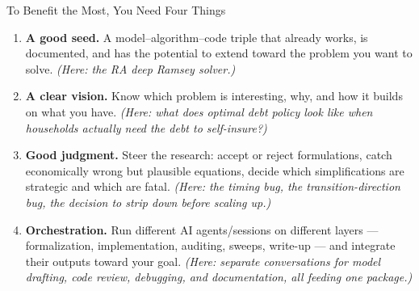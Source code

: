 \documentclass[10pt,aspectratio=169]{beamer}
\begin{document}
\begin{frame}{To Benefit the Most, You Need Four Things}
\begin{enumerate}
    \item \textbf{A good seed.} A model--algorithm--code triple that already works, is documented,
          and has the potential to extend toward the problem you want to solve.
          \emph{(Here: the RA deep Ramsey solver.)}
    \medskip
    \item \textbf{A clear vision.} Know which problem is interesting, why, and how it builds on
          what you have. \emph{(Here: what does optimal debt policy look like when households
          actually need the debt to self-insure?)}
    \medskip
    \item \textbf{Good judgment.} Steer the research: accept or reject formulations, catch
          economically wrong but plausible equations, decide which simplifications are strategic
          and which are fatal. \emph{(Here: the timing bug, the transition-direction bug, the
          decision to strip down before scaling up.)}
    \medskip
    \item \textbf{Orchestration.} Run different AI agents/sessions on different layers ---
          formalization, implementation, auditing, sweeps, write-up --- and integrate their
          outputs toward your goal. \emph{(Here: separate conversations for model drafting,
          code review, debugging, and documentation, all feeding one package.)}
\end{enumerate}
\end{frame}
\end{document}
